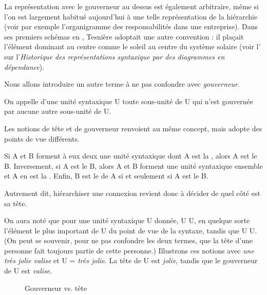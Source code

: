 La représentation avec le gouverneur au dessus est également arbitraire, même si l’on est largement habitué aujourd’hui à une telle représentation de la hiérarchie (voir par exemple l’organigramme des responsabilités dans une entreprise). Dans ses premiers schémas en \citeyear{tesniere1934comment}, Tesnière adoptait une autre convention : il plaçait l’élément dominant au centre comme le soleil au centre du système solaire (voir l’ sur l’\textit{Historique des représentations syntaxique par des diagrammes en dépendance}).

Nous allons introduire un autre terme à ne pas confondre avec \textit{gouverneur}.

{On appelle  d’une unité syntaxique U toute sous-unité de U qui n’est gouvernée par aucune autre sous-unité de U.}

Les notions de tête et de gouverneur renvoient au même concept, mais adopte des points de vue différents.

{Si A et B forment à eux deux une unité syntaxique dont A est la , alors A est le  B. Inversement, si A est le  B, alors A et B forment une unité syntaxique ensemble et A en est la . Enfin, B est le  de A si et seulement si A est le  B.}

Autrement dit, hiérarchiser une connexion revient donc à décider de quel côté est sa tête.

On aura noté que pour une unité syntaxique U donnée,  U  U, en quelque sorte l’élément le plus important de U du point de vue de la syntaxe, tandis que  U  U. (On peut se souvenir, pour ne pas confondre les deux termes, que la tête d’une personne fait toujours partie de cette personne.) Illustrons ces notions avec \textit{une très jolie valise} et U = \textit{très jolie}. La tête de U est \textit{jolie}, tandis que le gouverneur de U est \textit{valise}.

\begin{figure}
  \caption{\label{fig:}Gouverneur vs. tête}
\end{figure}

